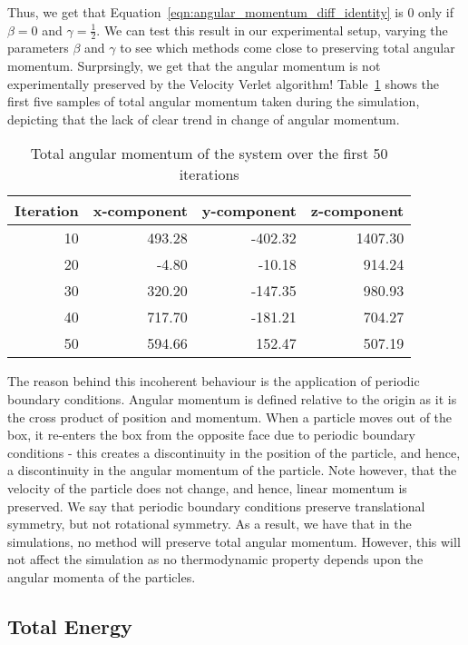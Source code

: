 \documentclass[../Main.tex]{subfiles}
\begin{document}
Thus, we get that Equation~\ref{eqn:angular_momentum_diff_identity} is 0 only if $\beta = 0$ and $\gamma = \frac{1}{2}$. 
We can test this result in our experimental setup, varying the parameters $\beta$ and $\gamma$ to see which methods come close to preserving total angular momentum. Surprsingly, we get that the angular momentum is not experimentally preserved by the Velocity Verlet algorithm! Table~\ref{tbl:total_angular_momentum_50_iterations} shows the first five samples of total angular momentum taken during the simulation, depicting that the lack of clear trend in change of angular momentum. 
\begin{table}[h]
	\centering
	\begin{tabular}{ |r|r|r|r| }
		\hline
		Iteration & x-component & y-component & z-component\\
		\hline
		10 & 493.28 & -402.32 & 1407.30 \\
		20 & -4.80 & -10.18 & 914.24 \\
		30 & 320.20 & -147.35 & 980.93 \\
		40 & 717.70 & -181.21 & 704.27 \\
		50 & 594.66 & 152.47 & 507.19 \\
		\hline
	\end{tabular}
	\caption{Total angular momentum of the system over the first 50 iterations}
	\label{tbl:total_angular_momentum_50_iterations}
\end{table}

The reason behind this incoherent behaviour is the application of periodic boundary conditions. Angular momentum is defined relative to the origin as it is the cross product of position and momentum. When a particle moves out of the box, it re-enters the box from the opposite face due to periodic boundary conditions - this creates a discontinuity in the position of the particle, and hence, a discontinuity in the angular momentum of the particle. Note however, that the velocity of the particle does not change, and hence, linear momentum is preserved. We say that periodic boundary conditions preserve translational symmetry, but not rotational symmetry.
As a result, we have that in the simulations, no method will preserve total angular momentum. However, this will not affect the simulation as no thermodynamic property depends upon the angular momenta of the particles.
 
\subsection{Total Energy}
\end{document}
